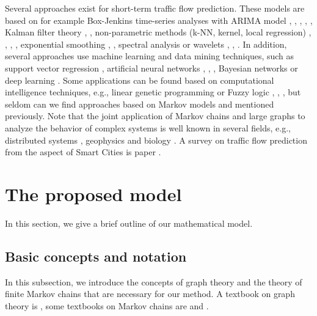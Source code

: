 \documentclass[b5paper,12pt]{report}
\theoremstyle{definition}
\begin{document}
Several approaches exist for short-term traffic flow prediction. These models are based on for example Box-Jenkins time-series analyses with ARIMA model \cite{van1996combining}, \cite{lee1999application}, \cite{stathopoulos2003multivariate}, \cite{ghosh2009multivariate}, \cite{xue2008short}, Kalman filter theory \cite{wang2005real}, \cite{ngoduy2011low}, non-parametric methods (k-NN, kernel, local regression) \cite{davis1991nonparametric}, \cite{smith2002comparison}, \cite{turochy2004relating}, \cite{smith1997traffic}, exponential smoothing \cite{messer1993advanced}, \cite{castro2009online}, spectral analysis \cite{nicholson1974prediction} or wavelets \cite{jiang2005dynamic}, \cite{xie2006wavelet}, \cite{cheng2007mining}. In addition, several approaches use machine learning and data mining techniques, such as support vector regression \cite{jeong2013supervised}, artificial neural networks \cite{chan2012neural}, \cite{park1998short}, \cite{dia2001object}, Bayesian networks \cite{sun2006bayesian} or deep learning \cite{lv2015traffic}. Some applications can be found based on computational intelligence techniques, e.g., linear genetic programming \cite{brameier2007basic} or Fuzzy logic \cite{iokibe1993traffic}, \cite{li2006type}, \cite{zhang2008short}, but seldom can we find approaches based on Markov models \cite{necula2014dynamic} and \cite{Crisostomietal2011} mentioned previously. Note that the joint application of Markov chains and large graphs to analyze the behavior of complex systems is well known in several fields, e.g., distributed systems \cite{dabrowski2011hunt}, geophysics \cite{Cavers2015Vasudevan} and biology \cite{Lesne2006}. A survey on traffic flow prediction from the aspect of Smart Cities is paper \cite{NAGY2018148}.

\section{The proposed model}
\label{model-desc}

In this section, we give a brief outline of our mathematical model.

\subsection{Basic concepts and notation}
\label{model-basics}

In this subsection, we introduce the concepts of graph theory and the theory of finite Markov chains that are necessary for our method. A textbook on graph theory is \cite{JensenGutin2007}, some textbooks on Markov chains are \cite{Asmussen2003} and \cite{Bremaud1999}.
\end{document}
